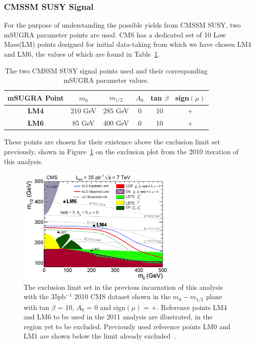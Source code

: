\subsubsection{CMSSM SUSY Signal}
For the purpose of understanding the possible yields from CMSSM SUSY, two mSUGRA parameter points are used. CMS has a dedicated set of 10 Low Mass(LM) points designed for initial data-taking from which we have chosen LM4 and LM6, the values of which are found in Table~\ref{tab:LM}.

\begin{table}[htbp]
\centering
\begin{tabular}{c c c c c c }
\hline
\hline
\textbf{mSUGRA Point} & $m_{0}$ & $m_{1/2}$ & $A_{0}$ & tan $\beta$ & sign$(\mu) $ \\
\hline
\hline
\textbf{LM4} & 210 GeV & 285 GeV & 0 & 10 & + \\
\textbf{LM6} & 85 GeV & 400 GeV & 0 & 10 & +\\
\hline
\end{tabular}
\caption{\label{tab:LM}The two CMSSM SUSY signal points used and their corresponding mSUGRA parameter values.}
\end{table}

These points are chosen for their existence above the exclusion limit set previously, shown in Figure~\ref{fig:lm35limit} on the exclusion plot from the 2010 iteration of this analysis\cite{35paper}.

\begin{figure}[htbp]
\centering
\includegraphics[width=0.70\textwidth]{Figures/Analysis/LM46on35limit}
\caption{\label{fig:lm35limit}The exclusion limit set in the previous incarnation of this analysis with the 35pb$^{-1}$ 2010 CMS dataset shown in the $m_{0}-m_{1/2}$ plane with tan $\beta$ = 10, $A_{0}$ = 0 and sign$(\mu)$ = +. Reference points LM4 and LM6 to be used in the 2011 analysis are illustrated, in the region yet to be excluded. Previously used reference points LM0 and LM1 are shown below the limit already excluded~\cite{35paper}.}
\end{figure}

